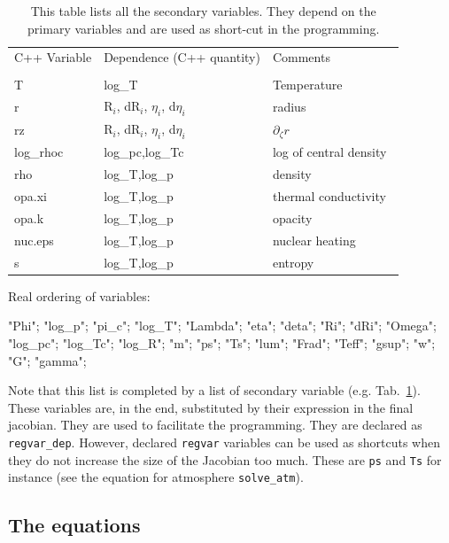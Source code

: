 \begin{table}
\begin{center}
\begin{tabular}{lll}
\hline
C++ Variable & Dependence (C++ quantity) & Comments \\
\\
T  & log\_T & Temperature \\
r  & R$_i$, dR$_i$, $\eta_i$, d$\eta_i$      & radius \\
rz &    R$_i$, dR$_i$, $\eta_i$, d$\eta_i$   & $\partial_\zeta r$\\
log\_rhoc &   log\_pc,log\_Tc   & log of central density \\
rho &   log\_T,log\_p    & density \\
opa.xi &   log\_T,log\_p    & thermal conductivity \\
opa.k &   log\_T,log\_p    & opacity \\
nuc.eps &   log\_T,log\_p    & nuclear heating \\
s  &   log\_T,log\_p    & entropy \\
\hline
\end{tabular}
\end{center}
\caption[]{This table lists all the secondary variables. They depend on the
primary variables and are used as short-cut in the programming.}
\label{depvar}
\end{table}





\noindent Real ordering of variables:

"Phi"; "log\_p"; "pi\_c"; "log\_T"; "Lambda"; "eta"; "deta"; "Ri"; "dRi";
"Omega"; "log\_pc"; "log\_Tc"; "log\_R"; "m"; "ps"; "Ts"; "lum"; "Frad";
"Teff"; "gsup"; "w"; "G"; "gamma";

Note that this list is completed by a list of secondary variable
(e.g. Tab.~\ref{depvar}). These variables are, in the end, substituted
by their expression in the final jacobian. They are used to facilitate
the programming. They are declared as {\tt regvar\_dep}. However,
declared {\tt regvar} variables can be used as shortcuts when they do
not increase the size of the Jacobian too much. These are {\tt ps} and
{\tt Ts} for instance (see the equation for atmosphere {\tt solve\_atm}).


\subsection{The equations}

